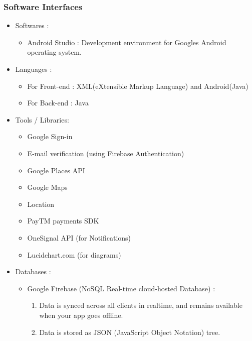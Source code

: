 \documentclass{report}
\begin{document}
\subsubsection{Software Interfaces}
\begin{itemize}[label=$\diamond$]
\item Softwares :
\begin{itemize}[label=$\rightarrow$]
\item Android Studio : Development environment for Google\textquotesingle s Android operating system.
\end{itemize}
\item Languages :
\begin{itemize}[label=$\rightarrow$]
\item For Front-end : XML(eXtensible Markup Language) and Android(Java)
\item For Back-end : Java
\end{itemize}

\item Tools / Libraries:
\begin{itemize}[label=$\rightarrow$]
\item Google Sign-in
\item E-mail verification (using Firebase Authentication)
\item Google Places API
\item Google Maps
\item Location
\item PayTM payments SDK\cite{c17}
\item OneSignal API (for Notifications)
\item Lucidchart.com\cite{c12} (for diagrams)
\end{itemize}

\item Databases :
\begin{itemize}[label=$\rightarrow$]
\item Google Firebase (NoSQL Real-time cloud-hosted Database) :
\begin{enumerate}
\item Data is synced across all clients in realtime, and remains available when your app goes offline.
\item Data is stored as JSON (JavaScript Object Notation) tree.
\end{enumerate}
\end{itemize}

\end{itemize}
\end{document}
